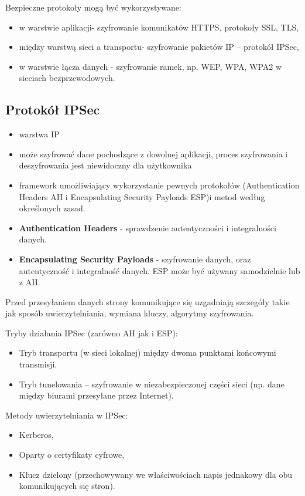 \documentclass[../main.tex]{subfiles}
\begin{document}
    Bezpieczne protokoły mogą być wykorzystywane:
    \begin{itemize}
        \item w warstwie aplikacji- szyfrowanie komunikatów HTTPS, protokoły SSL, TLS,
        \item między warstwą sieci a transportu- szyfrowanie
        pakietów IP – protokół IPSec,
        \item w warstwie łącza danych - szyfrowanie ramek, np. WEP,
        WPA, WPA2 w sieciach bezprzewodowych.
    \end{itemize}


    \subsection{Protokół IPSec}
    \begin{itemize}
        \item warstwa IP
        \item może szyfrować dane pochodzące z dowolnej
        aplikacji, proces szyfrowania i deszyfrowania jest niewidoczny dla użytkownika
        \item framework umożliwiający wykorzystanie pewnych protokołów (Authentication Headers AH i Encapsulating Security Payloads ESP)i
        metod według określonych zasad.
        \item \textbf{Authentication Headers} -  sprawdzenie autentyczności i integralności danych.\\
        \item \textbf{Encapsulating Security Payloads} - szyfrowanie danych, oraz autentyczność i integralność danych. ESP może być
        używany samodzielnie lub z AH.
    \end{itemize}

    Przed przesyłaniem danych strony komunikujące się uzgadniają szczegóły takie jak sposób
    uwierzytelniania, wymiana kluczy, algorytmy szyfrowania.

    Tryby działania IPSec (zarówno AH jak i ESP):
    \begin{itemize}
        \item Tryb transportu (w sieci lokalnej) między dwoma punktami końcowymi transmisji.
        \item Tryb tunelowania – szyfrowanie w niezabezpieczonej części sieci (np. dane między
        biurami przesyłane przez Internet).
    \end{itemize}

    Metody uwierzytelniania w IPSec:
    \begin{itemize}
        \item Kerberos,
        \item Oparty o certyfikaty cyfrowe,
        \item Klucz dzielony (przechowywany we właściwościach napis jednakowy dla obu
        komunikujących się stron).
    \end{itemize}
\end{document}
